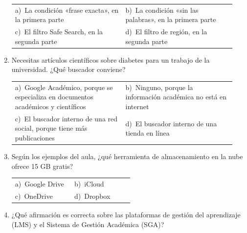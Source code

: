 \documentclass[11pt,a4paper]{article}
\begin{document}
\begin{enumerate}[label=\textbf{\arabic*.},leftmargin=*,itemsep=6pt,topsep=0pt]
\begin{minipage}[t]{\linewidth}
\vspace{4pt}
\begin{tabular}{@{}>{\raggedright\arraybackslash}p{0.47\linewidth}>{\raggedright\arraybackslash}p{0.47\linewidth}@{}}
a)~La condición «frase exacta», en la primera parte & b)~La condición «sin las palabras», en la primera parte \\
c)~El filtro Safe Search, en la segunda parte & d)~El filtro de región, en la segunda parte \\
\end{tabular}
\end{minipage}

\item \begin{minipage}[t]{\linewidth}
Necesitas artículos científicos sobre diabetes para un trabajo de la universidad. ¿Qué buscador conviene?

\vspace{4pt}
\begin{tabular}{@{}>{\raggedright\arraybackslash}p{0.47\linewidth}>{\raggedright\arraybackslash}p{0.47\linewidth}@{}}
a)~Google Académico, porque se especializa en documentos académicos y científicos & b)~Ninguno, porque la información académica no está en internet \\
c)~El buscador interno de una red social, porque tiene más publicaciones & d)~El buscador interno de una tienda en línea \\
\end{tabular}
\end{minipage}

\item \begin{minipage}[t]{\linewidth}
Según los ejemplos del aula, ¿qué herramienta de almacenamiento en la nube ofrece 15 GB gratis?

\vspace{4pt}
\begin{tabular}{@{}>{\raggedright\arraybackslash}p{0.47\linewidth}>{\raggedright\arraybackslash}p{0.47\linewidth}@{}}
a)~Google Drive & b)~iCloud \\
c)~OneDrive & d)~Dropbox \\
\end{tabular}
\end{minipage}

\item \begin{minipage}[t]{\linewidth}
¿Qué afirmación es correcta sobre las plataformas de gestión del aprendizaje (LMS) y el Sistema de Gestión Académica (SGA)?


\end{minipage}
\end{enumerate}
\end{document}
